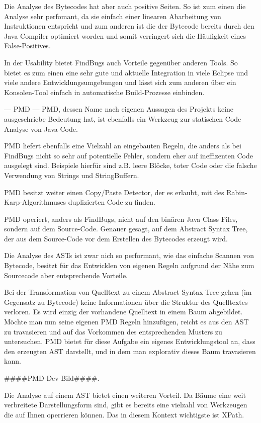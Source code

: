 Die Analyse des Bytecodes hat aber auch positive Seiten. So ist zum einen die Analyse sehr perfomant, da sie einfach einer linearen Abarbeitung von Instruktionen entspricht und zum anderen ist die der Bytecode bereits durch den Java Compiler optimiert worden und somit verringert sich die Häufigkeit eines False-Positives.

In der Usability bietet FindBugs auch Vorteile gegenüber anderen Tools. So bietet es zum einen eine sehr gute und aktuelle Integration in viele Eclipse und viele andere Entwicklungsumgebungen und lässt sich zum anderen über ein Konsolen-Tool einfach in automatische Build-Prozesse einbinden.


--- PMD ---
PMD, dessen Name nach eigenen Aussagen des Projekts keine ausgeschriebe Bedeutung hat, ist ebenfalls ein Werkzeug zur statischen Code Analyse von Java-Code. 

PMD liefert ebenfalls eine Vielzahl an eingebauten Regeln, die anders als bei FindBugs nicht so sehr auf potentielle Fehler, sondern eher auf ineffizenten Code ausgelegt sind. Beispiele hierfür sind z.B. leere Blöcke, toter Code oder die falsche Verwendung von Strings und StringBuffern. 

PMD besitzt weiter einen Copy/Paste Detector, der es erlaubt, mit des Rabin-Karp-Algorithmuses duplizierten Code zu finden.

PMD operiert, anders als FindBugs, nicht auf den binären Java Class Files, sondern auf dem Source-Code. Genauer gesagt, auf dem Abstract Syntax Tree, der aus dem Source-Code vor dem Erstellen des Bytecodes erzeugt wird. 

Die Analyse des ASTs ist zwar nich so performant, wie das einfache Scannen von Bytecode, besitzt für das Entwicklen von eigenen Regeln aufgrund der Nähe zum Sourcecode aber entsprechende Vorteile.

Bei der Transformation von Quelltext zu einem Abstract Syntax Tree gehen (im Gegensatz zu Bytecode) keine Informationen über die Struktur des Quelltextes verloren. Es wird einzig der vorhandene Quelltext in einem Baum abgebildet. 
Möchte man nun seine eigenen PMD Regeln hinzufügen, reicht es aus den AST zu travasieren und auf das Vorkommen des entsprechenden Musters zu untersuchen. PMD bietet für diese Aufgabe ein eigenes Entwicklungstool an, dass den erzeugten AST darstellt, und in dem man explorativ dieses Baum travasieren kann.

####PMD-Dev-Bild####.

Die Analyse auf einem AST bietet einen weiteren Vorteil. Da Bäume eine weit verbreitete Darstellungsform sind, gibt es bereits eine vielzahl von Werkzeugen die auf Ihnen operrieren können. Das in diesem Kontext wichtigste ist XPath.


